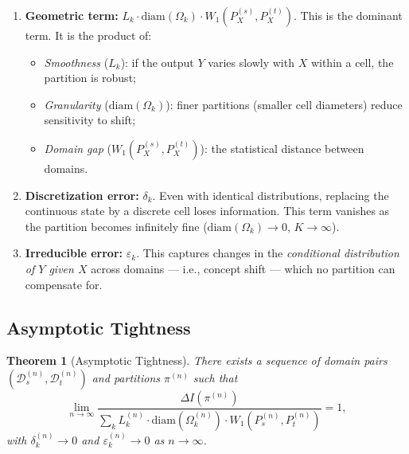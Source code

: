\documentclass[12pt,a4paper]{article}
\newtheorem{theorem}{Theorem}[section]
\newcommand{\cD}{\mathcal{D}}
\newcommand{\Wass}{W_1}
\newcommand{\diam}{\mathrm{diam}}
\begin{document}
\begin{enumerate}[label=(\alph*)]
    \item \textbf{Geometric term:} $L_k\cdot\diam(\Omega_k)\cdot\Wass(P^{(s)}_X,P^{(t)}_X)$.
          This is the dominant term.  It is the product of:
          \begin{itemize}
              \item \emph{Smoothness} ($L_k$): if the output $Y$ varies
                    slowly with $X$ within a cell, the partition is robust;
              \item \emph{Granularity} ($\diam(\Omega_k)$): finer
                    partitions (smaller cell diameters) reduce sensitivity
                    to shift;
              \item \emph{Domain gap} ($\Wass(P^{(s)}_X,P^{(t)}_X)$):
                    the statistical distance between domains.
          \end{itemize}
    \item \textbf{Discretization error:} $\delta_k$.  Even with identical
          distributions, replacing the continuous state by a discrete cell
          loses information.  This term vanishes as the partition becomes
          infinitely fine ($\diam(\Omega_k)\to0$, $K\to\infty$).
    \item \textbf{Irreducible error:} $\varepsilon_k$.  This captures
          changes in the \emph{conditional distribution of $Y$ given $X$}
          across domains — i.e., concept shift — which no partition can
          compensate for.
\end{enumerate}

\subsection{Asymptotic Tightness}

\begin{theorem}[Asymptotic Tightness]
\label{thm:tightness}
There exists a sequence of domain pairs
$(\cD_s^{(n)},\cD_t^{(n)})$ and partitions $\pi^{(n)}$ such that
\begin{equation}\label{eq:tightness}
    \lim_{n\to\infty}
    \frac{\Delta I(\pi^{(n)})}
         {\sum_{k} L_k^{(n)}\cdot\diam(\Omega_k^{(n)})\cdot
          \Wass(P^{(n)}_s,P^{(n)}_t)}
    = 1,
\end{equation}
with $\delta_k^{(n)}\to0$ and $\varepsilon_k^{(n)}\to0$ as $n\to\infty$.
\end{theorem}
\end{document}

